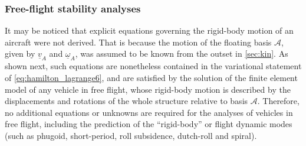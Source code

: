 \documentclass[12pt,a4paper,oneside,english]{abntex2} %
\newcommand{\fix}[1]{{\color{red}#1}}
\newcommand{\vect}[1]{\underline{#1}}
\def\A{\mathcal{A}}
\def\vA{\vect{v}_A}
\def\omA{\vect{\omega}_A}
\begin{document}
\subsubsection{Free-flight stability analyses}
\label{sec:free_flight_stability}

It may be noticed that explicit equations governing the rigid-body motion of an aircraft were not derived. That is because the motion of the floating basis $\A$, given by $\vA$ and $\omA$, was assumed to be known from the outset in \cref{sec:kin}. \fix{As shown next, such equations are nonetheless contained in the variational statement of \cref{eq:hamilton_lagrange6}, and are satisfied by the solution of the finite element model of any vehicle in free flight, whose rigid-body motion is described by the displacements and rotations of the whole structure relative to basis $\A$. Therefore, no additional equations or unknowns are required for the analyses of vehicles in free flight, including the prediction of the ``rigid-body'' or flight dynamic modes (such as phugoid, short-period, roll subsidence, dutch-roll and spiral).} 
\end{document}
